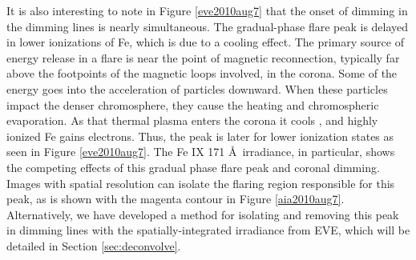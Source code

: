 It is also interesting to note in Figure \ref{eve2010aug7} that the onset of dimming in the dimming lines is nearly simultaneous. The gradual-phase flare peak is delayed in lower ionizations of Fe, which is due to a cooling effect. The primary source of energy release in a flare is near the point of magnetic reconnection, typically far above the footpoints of the magnetic loops involved, in the corona. Some of the energy goes into the acceleration of particles downward. When these particles impact the denser chromosphere, they cause the heating and chromospheric evaporation. As that thermal plasma enters the corona it cools \citep{Fletcher2011}, and highly ionized Fe gains electrons. Thus, the peak is later for lower ionization states as seen in Figure \ref{eve2010aug7}. The Fe IX 171 \AA\ irradiance, in particular, shows the competing effects of this gradual phase flare peak and coronal dimming. Images with spatial resolution can isolate the flaring region responsible for this peak, as is shown with the magenta contour in Figure \ref{aia2010aug7}. Alternatively, we have developed a method for isolating and removing this peak in dimming lines with the spatially-integrated irradiance from EVE, which will be detailed in Section \ref{sec:deconvolve}. 

